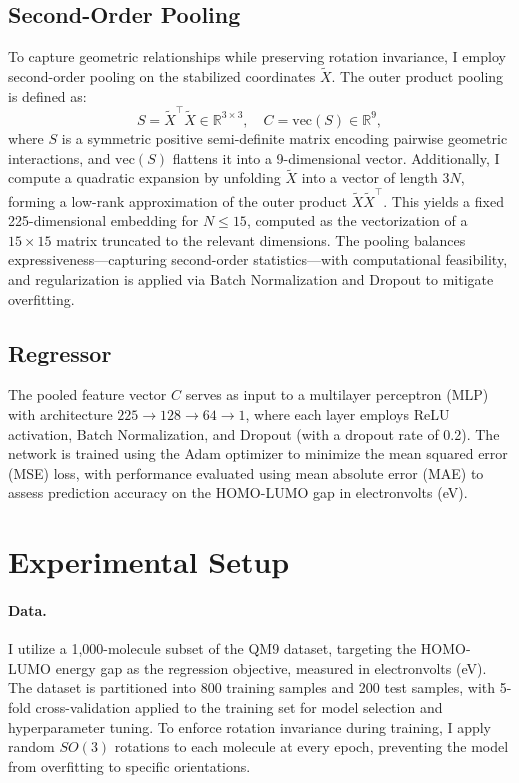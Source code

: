 \documentclass[12pt]{article}
\begin{document}
\subsection{Second-Order Pooling}
To capture geometric relationships while preserving rotation invariance, I employ second-order pooling on the stabilized coordinates $\tilde{X}$. The outer product pooling is defined as:
\begin{equation}
\label{eq:pool}
S = \tilde{X}^\top \tilde{X} \in \mathbb{R}^{3 \times 3}, \quad C = \mathrm{vec}(S) \in \mathbb{R}^{9},
\end{equation}
where $S$ is a symmetric positive semi-definite matrix encoding pairwise geometric interactions, and $\mathrm{vec}(S)$ flattens it into a 9-dimensional vector. Additionally, I compute a quadratic expansion by unfolding $\tilde{X}$ into a vector of length $3N$, forming a low-rank approximation of the outer product $\tilde{X} \tilde{X}^\top$. This yields a fixed 225-dimensional embedding for $N \leq 15$, computed as the vectorization of a $15 \times 15$ matrix truncated to the relevant dimensions. The pooling balances expressiveness—capturing second-order statistics—with computational feasibility, and regularization is applied via Batch Normalization and Dropout to mitigate overfitting.

\subsection{Regressor}
The pooled feature vector $C$ serves as input to a multilayer perceptron (MLP) with architecture $225 \rightarrow 128 \rightarrow 64 \rightarrow 1$, where each layer employs ReLU activation, Batch Normalization, and Dropout (with a dropout rate of 0.2). The network is trained using the Adam optimizer to minimize the mean squared error (MSE) loss, with performance evaluated using mean absolute error (MAE) to assess prediction accuracy on the HOMO-LUMO gap in electronvolts (eV).

\section{Experimental Setup}
\paragraph{Data.} I utilize a 1,000-molecule subset of the QM9 dataset, targeting the HOMO-LUMO energy gap as the regression objective, measured in electronvolts (eV). The dataset is partitioned into 800 training samples and 200 test samples, with 5-fold cross-validation applied to the training set for model selection and hyperparameter tuning. To enforce rotation invariance during training, I apply random $SO(3)$ rotations to each molecule at every epoch, preventing the model from overfitting to specific orientations.
\end{document}
